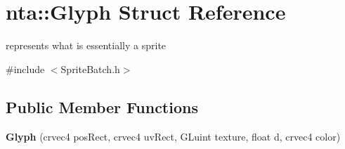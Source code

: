 \hypertarget{structnta_1_1Glyph}{}\section{nta\+:\+:Glyph Struct Reference}
\label{structnta_1_1Glyph}


represents what is essentially a sprite  




{\ttfamily \#include $<$Sprite\+Batch.\+h$>$}

\subsection*{Public Member Functions}
\begin{DoxyCompactItemize}
\item 
\mbox{\label{structnta_1_1Glyph_ae400ec6b413eee3d1f091ff9cc594bba}} 
{\bfseries Glyph} (crvec4 pos\+Rect, crvec4 uv\+Rect, G\+Luint texture, float d, crvec4 color)
\end{DoxyCompactItemize}
